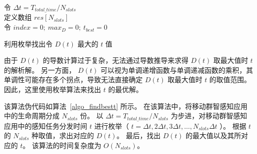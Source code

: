 \begin{algorithm}[!b]
  \setstretch{\algostretch}
  令 $\Delta t = T_{total\_time}/N_{slots}$\\
  定义数组 $res[N_{slots}]$ \\
  令 $index = 0;\ max_D = 0;\ t_{best} = 0$\\
  \caption{利用枚举找出令 $D(t)$ 最大的 $t$ 值}
  \label{algo_findbestt}
\end{algorithm}

由于 $D(t)$ 的导数计算过于复杂，无法通过导数推导来求得 $D(t)$ 取最大值时 $t$ 的解析解。
另一方面， $D(t)$ 可以视为单调递增函数与单调递减函数的乘积，其单调性可能存在多个拐点，导致无法直接确定 $D(t)$ 取最大值时 $t$ 的取值范围。
因此，这里使用枚举算法来找出 $t$ 的最优解。

该算法伪代码如算法~\ref{algo_findbestt} 所示。
在该算法中，将移动群智感知应用中的生命周期分成 $N_{slots}$ 份。
以 $\Delta t = T_{total\_time} / N_{slots}$ 为步进，对移动群智感知应用中的感知任务分发时间 $t$ 进行枚举（ $t = \Delta t, 2 \Delta t, 3 \Delta t, \ldots , N_{slots} \Delta t$ ）。
根据 $t$ 的 $N_{slots}$ 种取值，求出对应的 $D(t)$。
最后，找出 $D(t)$ 的最大值以及其所对应的 $t$。
该算法的时间复杂度为 $O(N_{slots})$。



